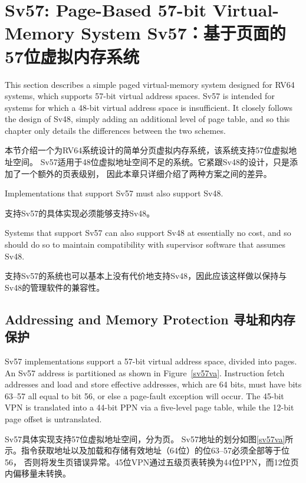 \section{Sv57: Page-Based 57-bit Virtual-Memory System Sv57：基于页面的57位虚拟内存系统}
\label{sec:sv57}

This section describes a simple paged virtual-memory system designed
for RV64 systems, which supports 57-bit virtual address spaces.  Sv57
is intended for systems for which a 48-bit virtual address space is
insufficient.  It closely follows the design of Sv48, simply adding an
additional level of page table, and so this chapter only details the
differences between the two schemes.

本节介绍一个为RV64系统设计的简单分页虚拟内存系统，该系统支持57位虚拟地址空间。
Sv57适用于48位虚拟地址空间不足的系统。它紧跟Sv48的设计，只是添加了一个额外的页表级别，
因此本章只详细介绍了两种方案之间的差异。

Implementations that support Sv57 must also support Sv48.

支持Sv57的具体实现必须能够支持Sv48。
\begin{commentary}
Systems that support Sv57 can also support Sv48 at essentially no cost, and so
should do so to maintain compatibility with supervisor software that assumes
Sv48.

支持Sv57的系统也可以基本上没有代价地支持Sv48，因此应该这样做以保持与Sv48的管理软件的兼容性。 
\end{commentary}

\subsection{Addressing and Memory Protection 寻址和内存保护}
Sv57 implementations support a 57-bit virtual address space, divided
into  pages.  An Sv57 address is partitioned as
shown in Figure~\ref{sv57va}.
Instruction fetch addresses and load and store effective addresses,
which are 64 bits, must have bits 63--57 all equal to bit 56, or else
a page-fault exception will occur.  The 45-bit VPN is translated into a
44-bit PPN via a five-level page table, while the 12-bit page offset
is untranslated.

Sv57具体实现支持57位虚拟地址空间，分为页。
Sv57地址的划分如图\ref{sv57va}所示。指令获取地址以及加载和存储有效地址（64位）的位63--57必须全部等于位56，
否则将发生页错误异常。45位VPN通过五级页表转换为44位PPN，而12位页内偏移量未转换。

